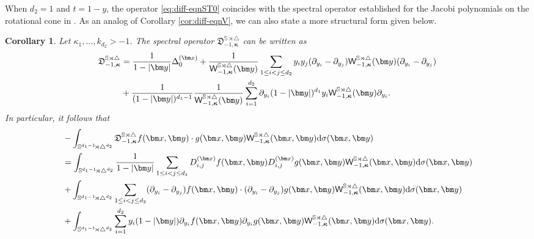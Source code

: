 \documentclass{amsart}
\newtheorem{cor}[thm]{Corollary}
\theoremstyle{remark}
\def\la{{\langle}}
\def\ra{{\rangle}}
\def\d{\mathrm{d}}
\def\sW{{\mathsf W}}
\def\fD{{\mathfrak D}}
\def\k{{\kappa}}
\def\s{\sigma}
\def\la{{\langle}}
\def\ra{{\rangle}}
\def\SS{{\mathbb S}}
\def\bk{{\boldsymbol{\kappa}}}
\begin{document}
When $d_2 =1$ and $t=1-y$, the operator \eqref{eq:diff-eqnST0} coincides with the spectral operator established for
the Jacobi polynomials on the rotational cone in \cite{X20}. As an analog of Corollary \ref{cor:diff-eqnV}, we can 
also state a more structural form given below.

\begin{cor} \label{cor:ST0}
Let $\k_1,\ldots, k_{d_2} > -1$. The spectral operator $\fD_{-1, \bk}^{\SS \rtimes \triangle}$ can be written as 
\begin{align} \label{eq:diff-eqnST02}
  \fD_{-1, \bk}^{\SS \rtimes \triangle} & = \frac{1}{1-|\bm y|} \Delta_0^{(\bm x)} 
      + \frac{1}{\sW_{-1,\bk}^{\SS \rtimes \triangle}(\bm y)} 
        \sum_{1\le i< j \le d_2} y_i y_j (\partial_{y_i} - \partial_{y_j}) \sW_{-1,\bk}^{\SS \rtimes \triangle}(\bm y)
   (\partial_{y_i} - \partial_{y_j}) \notag \\
   & +  \frac{1}{(1-|\bm y|)^{d_1-1}} \frac{1}{\sW_{-1,\bk}^{\SS \rtimes \triangle}(\bm y)}  \sum_{i=1}^{d_2}  
\partial_{y_i} (1-|\bm y|)^{d_1} y_i \sW_{-1,\bk}^{\SS \rtimes \triangle}(\bm y) \partial_{y_i}. 
 \end{align}
In particular, it follows that 
\begin{align} \label{eq:self-adjV0} 
   & - \int_{\SS^{d_1-1} \!\rtimes \triangle^{d_2}}\fD_{-1, \bk}^{\SS \rtimes \triangle}f (\bm x,\bm y) \cdot g(\bm x, \bm y)
     \sW_{-1, \bk}^{\SS \rtimes \triangle}(\bm x, \bm y) \d \s(\bm x, \bm y)  \\ 
  &   =  \int_{\SS^{d_1-1} \!\rtimes \triangle^{d_2}}  \frac{1}{1-|\bm y|} 
      \sum_{1 \le i< j \le d_1}  D_{i,j}^{(\bm x)} f(\bm x, \bm y)  D_{i,j}^{(\bm x)} g(\bm x, \bm y) 
  \sW_{-1,\bk}^{\SS \rtimes \triangle}(\bm x,\bm y)  \d \s(\bm x, \bm y)    \notag \\ 
  & + \int_{\SS^{d_1-1} \!\rtimes \triangle^{d_2}}   \sum_{1\le i< j \le d_2} (\partial_{y_i} - \partial_{y_j}) f(\bm x,\bm y) \cdot 
    (\partial_{y_i} - \partial_{y_j})g(\bm x,\bm y)
  \sW_{-1, \bk}^{\SS \rtimes \triangle}(\bm x,\bm y)  \d \s(\bm x, \bm y)    \notag \\
    &  +  \int_{\SS^{d_1-1} \!\rtimes \triangle^{d_2}} \sum_{i=1}^{d_2} y_i (1-|\bm y|)  \partial_{y_i} f(\bm x,\bm y) \partial_{y_i} g(\bm x,\bm y) 
       \sW_{-1,\bk}^{\SS \rtimes \triangle}(\bm x,\bm y)   \d \s(\bm x, \bm y).  \notag
 \end{align}
 \end{cor}
\end{document}
